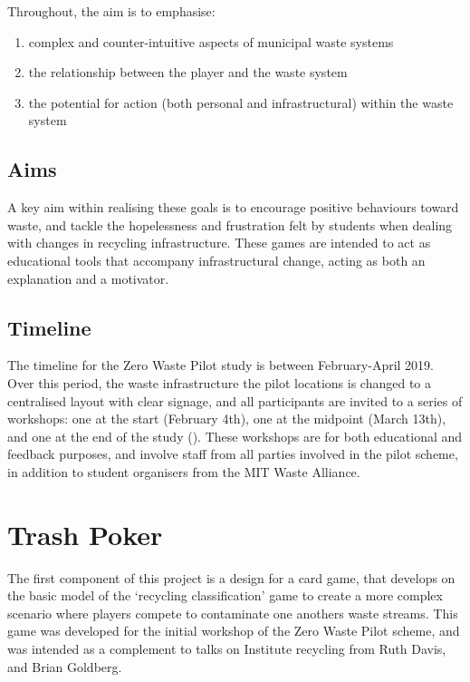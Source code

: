 \documentclass[nofonts,nols,justified,nobib]{tufte-book}
\begin{document}
Throughout, the aim is to emphasise: 
\begin{enumerate}
\item complex and counter-intuitive aspects of municipal waste systems
\item the relationship between the player and the waste system
\item the potential for action (both personal and infrastructural) within the waste system
\end{enumerate}

\subsection*{Aims}

A key aim within realising these goals is to encourage positive behaviours toward waste, and tackle the hopelessness and frustration felt by students when dealing with changes in recycling infrastructure. These games are intended to act as educational tools that accompany infrastructural change, acting as both an explanation and a motivator.

\subsection*{Timeline}

The timeline for the Zero Waste Pilot study is between February-April 2019. Over this period, the waste infrastructure the pilot locations is changed to a centralised layout with clear signage, and all participants are invited to a series of workshops: one at the start (February 4th), one at the midpoint (March 13th), and one at the end of the study (). These workshops are for both educational and feedback purposes, and involve staff from all parties involved in the pilot scheme, in addition to student organisers from the MIT Waste Alliance.

\section*{Trash Poker}

The first component of this project is a design for a card game, that develops on the basic model of the `recycling classification' game to create a more complex scenario where players compete to contaminate one anothers waste streams. This game was developed for the initial workshop of the Zero Waste Pilot scheme, and was intended as a complement to talks on Institute recycling from Ruth Davis, and Brian Goldberg.
\end{document}
